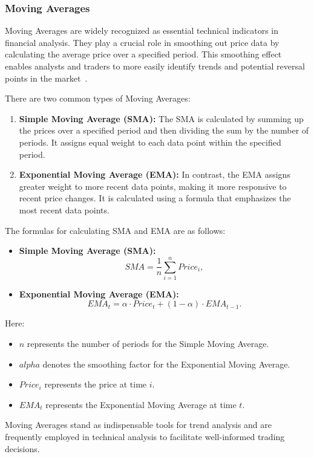 \documentclass[10pt,twocolumn,letterpaper]{article}
\begin{document}
\subsubsection{Moving Averages}

Moving Averages are widely recognized as essential technical indicators in financial analysis. They play a crucial role in smoothing out price data by calculating the average price over a specified period. This smoothing effect enables analysts and traders to more easily identify trends and potential reversal points in the market~\cite{PoonGranger}.

There are two common types of Moving Averages:
\begin{enumerate}
   \item \textbf{Simple Moving Average (SMA):} The SMA is calculated by summing up the prices over a specified period and then dividing the sum by the number of periods. It assigns equal weight to each data point within the specified period.

   \item \textbf{Exponential Moving Average (EMA):} In contrast, the EMA assigns greater weight to more recent data points, making it more responsive to recent price changes. It is calculated using a formula that emphasizes the most recent data points.
\end{enumerate}
The formulas for calculating SMA and EMA are as follows:
\begin{itemize}
   \item \textbf{Simple Moving Average (SMA):}
         \[ SMA = \frac{1}{n} \sum_{i=1}^{n} Price_i, \]
   \item \textbf{Exponential Moving Average (EMA):}
         \[ EMA_t = \alpha \cdot Price_t + (1 - \alpha) \cdot EMA_{t-1}. \]
\end{itemize}
Here:
\begin{itemize}
   \item \(n\) represents the number of periods for the Simple Moving Average.
   \item \(alpha\) denotes the smoothing factor for the Exponential Moving Average.
   \item \(Price_i\) represents the price at time \(i\).
   \item \(EMA_t\) represents the Exponential Moving Average at time \(t\).
\end{itemize}
Moving Averages stand as indispensable tools for trend analysis and are frequently employed in technical analysis to facilitate well-informed trading decisions.
\end{document}
